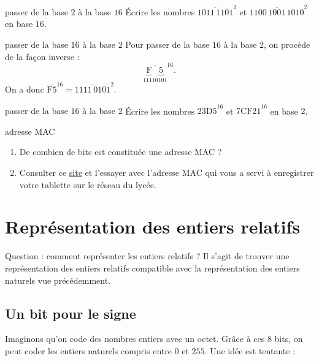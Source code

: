 \documentclass[a4paper,dvipsnames]{article}
\begin{document}
\smallskip

\begin{exercice}{passer de la base $2$ à la base $16$}{}
  Écrire les nombres $\overline{1011\,1101}^2$ et $\overline{1100\,1001\,1010}^2$ en base $16$.
\end{exercice}

\smallskip

\begin{methode}{passer de la base $16$ à la base $2$}{}
  Pour passer de la base $16$ à la base $2$, on procède de la façon inverse :
  \[\overline{\underbrace{\text{F}}_{1111}\underbrace{5}_{0101}}^{16}.\]
  On a donc $\overline{\text{F}5}^{16}=\overline{1111\,0101}^2$.
\end{methode}

\smallskip

\begin{exercice}{passer de la base $16$ à la base $2$}{}
  Écrire les nombres $\overline{23\text{D}5}^{16}$ et $\overline{7\text{CF}21}^{16}$ en base $2$.
\end{exercice}

\smallskip

\begin{exercice}{adresse MAC}{}
  \begin{enumerate}
    \item De combien de bits est constituée une adresse MAC ?
    \item Consulter ce \href{https://www.frameip.com/ethernet-oui-ieee/}{site} et l'essayer avec l'adresse MAC qui vous a servi à enregistrer votre tablette sur le réseau du lycée.
  \end{enumerate}
\end{exercice}

\section{Représentation des entiers relatifs}

Question : comment représenter les entiers relatifs ? Il s'agit de trouver une représentation des entiers relatifs {\color{red}compatible avec la représentation des entiers naturels} vue précédemment.

\subsection{Un bit pour le signe}
Imaginons qu'on code des nombres entiers avec un octet. Grâce à ces $8$ bits, on peut coder les entiers naturels compris entre $0$ et $255$. Une idée est tentante :
\end{document}
